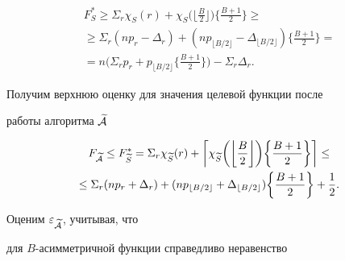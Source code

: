 \begin{pf}
\begin{gather*}
F_S^{\ast} \ge \Sigma_r\chi_S(r)+\chi_S


\biggl( \biggl\lfloor \frac {B}{2} \biggr \rfloor \biggr)


\biggl\{ \frac {B+1}{2}\biggr\} \ge \\


%


\ge  \Sigma_{r} (np_{r}-\Delta _{r})+


(np_{\lfloor B/2 \rfloor} - \Delta _{\lfloor B/2 \rfloor})


\biggl\{ \frac {B+1}{2}\biggr\} = \\


%


= n \biggl(


\Sigma_{r} p_{r}+p_{\lfloor B/2 \rfloor }


\biggl\{ \frac {B+1}{2}\biggr \}


\biggr) - \Sigma_{r} \Delta _{r}.


\end{gather*}





Получим верхнюю оценку для значения целевой функции после


работы алгоритма $\widetilde{ \cal A}$


\begin{gather*}


F_{\widetilde {\cal A}} \le F_{\widetilde S}^{\ast} =


\Sigma_{r} \chi_{\widetilde S}(r)+


\biggl\lceil \chi_{\widetilde S}


\biggl(\biggl \lfloor \frac {B}{2} \biggr \rfloor \biggr)


\biggl\{ \frac {B+1}{2}\biggr \}


\biggr \rceil \le \\


%


\le \Sigma_{r} (np_{r}+\Delta _{r})+


( np_{\lfloor B/2 \rfloor} + \Delta _{\lfloor B/2 \rfloor})


\biggl \{ \frac {B+1}{2}\biggr \} + \frac {1}{2}.


\end{gather*}





Оценим $\varepsilon_{\widetilde{ \cal A}}$, учитывая, что


для $B$-асимметричной функции справедливо неравенство



\end{pf}
